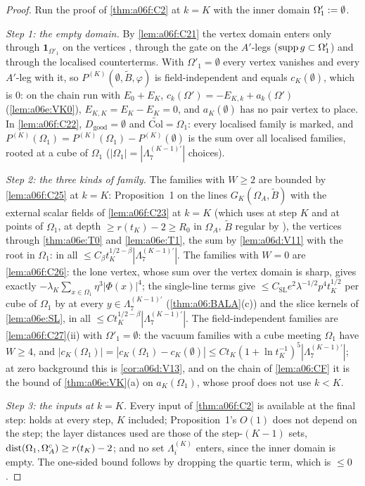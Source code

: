 \begin{proof}
Run the proof of \cref{thm:a06f:C2} at $k=K$ with the inner domain $\Omega'_1:=\emptyset$.

\emph{Step 1: the empty domain.} By \cref{lem:a06f:C21} the vertex domain enters only through $\mathbf 1_{\Omega'_1}$ on the vertices \cite[(1.6)--(1.7)]{Ba3}, through the gate on the $A'$-legs ($\operatorname{supp} g\subset\Omega'_1$) and through the localised counterterms. With $\Omega'_1=\emptyset$ every vertex vanishes and every $A'$-leg with it, so $P^{(K)}(\emptyset,\tilde B,\varphi)$ is field-independent and equals $c_K(\emptyset)$, which is $0$: on the chain run with $E_0+E_K$, $c_k(\Omega')=-E_{K,k}+a_k(\Omega')$ (\cref{lem:a06e:VK0}), $E_{K,K}=E_K-E_K=0$, and $a_K(\emptyset)$ has no pair vertex to place. In \cref{lem:a06f:C22}, $D_{\mathrm{good}}=\emptyset$ and $\widetilde{\mathrm{Col}}=\Omega_1$: every localised family is marked, and $P^{(K)}(\Omega_1)=P^{(K)}(\Omega_1)-P^{(K)}(\emptyset)$ is the sum over all localised families, rooted at a cube of $\Omega_1$ ($|\Omega_1|=|\Lambda^{(K-1)'}_7|$ choices).

\emph{Step 2: the three kinds of family.} The families with $W\ge2$ are bounded by \cref{lem:a06f:C25} at $k=K$: Proposition~1 on the lines $G_K(\Omega_A,\tilde B)$ with the external scalar fields of \cref{lem:a06f:C23} at $k=K$ (which uses \cite[(2.55)]{Ba2} at step $K$ and \cite[(2.24)--(2.25)]{Ba1} at points of $\Omega_1$, at depth $\ge r(t_K)-2\ge R_0$ in $\Omega_A$, $\tilde B$ regular by \cite[(2.60)]{Ba2}), the \cite[(1.7)]{Ba3} vertices through \cref{thm:a06e:T0} and \cref{lem:a06e:T1}, the sum by \cref{lem:a06d:V11} with the root in $\Omega_1$: in all $\le C_\beta t_K^{1/2-\beta}|\Lambda^{(K-1)'}_7|$. The families with $W=0$ are \cref{lem:a06f:C26}: the lone \cite[(1.6)]{Ba3} vertex, whose sum over the vertex domain is sharp, gives exactly $-\lambda_K\sum_{x\in\Omega_1}\eta^3|\Phi(x)|^4$; the single-line terms give $\le C_{\mathrm{SL}}e^2\lambda^{-1/2}p^4t_K^{1/2}$ per cube of $\Omega_1$ by \cite[Lemma~2.4, (2.65)--(2.66)]{Ba2} at every $y\in\Lambda^{(K-1)'}_7$ (\cref{thm:a06:BALA}(c)) and the slice kernels of \cref{lem:a06e:SL}, in all $\le Ct_K^{1/2-\beta}|\Lambda^{(K-1)'}_7|$. The field-independent families are \cref{lem:a06f:C27}(ii) with $\Omega'_1=\emptyset$: the vacuum families with a cube meeting $\Omega_1$ have $W\ge4$, and $|c_K(\Omega_1)|=|c_K(\Omega_1)-c_K(\emptyset)|\le Ct_K(1+\ln t_K^{-1})^5|\Lambda^{(K-1)'}_7|$; at zero background this is \cref{cor:a06d:V13}, and on the chain of \cref{lem:a06:CF} it is the bound of \cref{thm:a06e:VK}(a) on $a_K(\Omega_1)$, whose proof does not use $k<K$.

\emph{Step 3: the inputs at $k=K$.} Every input of \cref{thm:a06f:C2} is available at the final step: \cite[(2.55)]{Ba2} holds at every step, $K$ included; Proposition~1's $O(1)$ does not depend on the step; the layer distances used are those of the step-$(K-1)$ sets, $\operatorname{dist}(\Omega_1,\Omega_A^c)\ge r(t_K)-2$; and no set $\Lambda^{(K)}_i$ enters, since the inner domain is empty. The one-sided bound follows by dropping the quartic term, which is $\le0$.
\end{proof}

